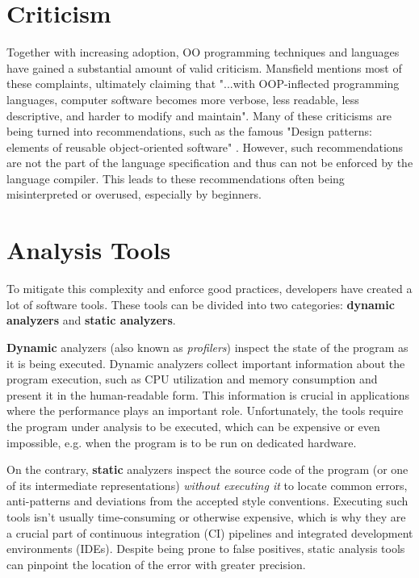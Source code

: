 \section{Criticism}

Together with increasing adoption, OO programming techniques and languages have gained a substantial amount of valid criticism. Mansfield \cite{oopfailed} mentions most of these complaints, ultimately claiming that "...with OOP-inflected programming languages, computer software becomes more
verbose, less readable, less descriptive, and harder to modify and maintain". Many of these criticisms are being turned into recommendations, such as the famous "Design patterns: elements of reusable object-oriented software" \cite{GOFPatterns}. However, such recommendations are not the part of the language specification and thus can not be enforced by the language compiler. This leads to these recommendations often being misinterpreted or overused, especially by beginners.

\section{Analysis Tools}
To mitigate this complexity and enforce good practices, developers have created a lot of software tools. These tools can be divided into two categories: \textbf{dynamic analyzers} and \textbf{static analyzers}.

\textbf{Dynamic} analyzers (also known as \textit{profilers}) inspect the state of the program as it is being executed. Dynamic analyzers collect important information about the program execution, such as CPU utilization and memory consumption and present it in the human-readable form. This information is crucial in applications where the performance plays an important role. Unfortunately, the tools require the program under analysis to be executed, which can be expensive or even impossible, e.g. when the program is to be run on dedicated hardware.

On the contrary, \textbf{static} analyzers inspect the source code of the program (or one of its intermediate representations) \textit{without executing it} to locate common errors, anti-patterns and deviations from the accepted style conventions. Executing such tools isn't usually time-consuming or otherwise expensive, which is why they are a crucial part of continuous integration (CI) pipelines and integrated development environments (IDEs).
Despite being prone to false positives, static analysis tools can pinpoint the location of the error with greater precision.

